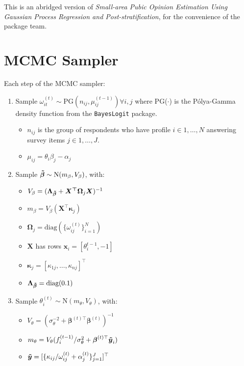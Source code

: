 \documentclass[12pt,letterpaper]{article}
\begin{document}
This is an abridged version of \textit{Small-area Pubic Opinion Estimation Using Gaussian Process Regression and Post-stratification}, for the convenience of the package team.
\section{MCMC Sampler}
Each step of the MCMC sampler:
\begin{enumerate}[(1)]
    \item Sample $\omega_{it}^{(t)} \sim \text{PG}(n_{ij}, \mu_{ij}^{(t-1)}) \forall i, j$ where PG($\cdot$) is the P\'olya-Gamma density function from the \texttt{BayesLogit} package. 
    \begin{itemize}
        \item $n_{ij}$ is the group of respondents who have profile $i \in 1,\dots, N$ answering survey items $j \in 1, \dots, J$.
        \item $\mu_{ij} = \theta_{i}\beta_{j} - \alpha_{j}$
    \end{itemize}
    \item Sample $\boldsymbol{\Tilde{\beta}} \sim \text{N}(m_{\beta}, V_{\beta})$, with:
    \begin{itemize}
        \item $V_{\beta} = (\boldsymbol{\Lambda_{\Tilde{\beta}}} + \boldsymbol{X^{\top}\Omega}_j\boldsymbol{X})^{-1}$
        \item $m_{\beta} = V_{\beta} (\boldsymbol{X}^{\top}\boldsymbol{\kappa}_j)$
        \item $\boldsymbol{\Omega}_j = \text{diag} (\{\omega_{ij}^{(t)}\}_{i = 1}^{N})$
        \item $\boldsymbol{X}$ has rows $\boldsymbol{x}_i = [\theta_{i}^{t-1}, -1]$
        \item $\boldsymbol{\kappa}_j = [\kappa_{1j}, \dots, \kappa_{nj}]^{\top}$
        \item $\boldsymbol{\Lambda_{\Tilde{\beta}}} = \text{diag} (0.1)$ 
    \end{itemize}
    \item Sample $\theta_{i}^{(t)} \sim \text{N}(m_{\theta}, V_{\theta})$, with:
    \begin{itemize}
        \item $V_{\theta} = (\sigma_{\theta}^{-2} + \boldsymbol{\beta}^{(t)\top}\boldsymbol{\beta}^{(t)})^{-1}$
        \item $m_{\theta} = V_{\theta} (f_{i}^{(t-1)} / \sigma_{\theta}^2 + \boldsymbol{\beta}^{(t)\top}\boldsymbol{\Tilde{y}}_i)$
        \item $\boldsymbol{\Tilde{y}} = [\{\kappa_{ij} / \omega_{ij}^{(t)} + \alpha_{j}^{(t)}\}_{j=1}^{J}]^{\top}$

\end{itemize}
\end{enumerate}
\end{document}

